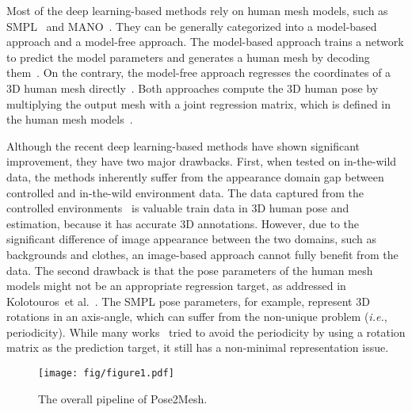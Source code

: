 \documentclass[runningheads]{llncs}
\begin{document}
Most of the deep learning-based methods rely on human mesh models, such as SMPL~\cite{loper2015smpl} and MANO~\cite{romero2017mano}.
They can be generally categorized into a model-based approach and a model-free approach.
The model-based approach trains a network to predict the model parameters and generates a human mesh by decoding them~\cite{bogo2016keep,lassner2017up,pavlakos2018l3d,omran2018neural,kanazawa2018hmr,kolotouros2019spin,panteleris2018using,baek2019pushing,boukhayma20193d}.
On the contrary, the model-free approach regresses the coordinates of a 3D human mesh directly~\cite{kolotouros2019cmr,ge2019handgcn}.
Both approaches compute the 3D human pose by multiplying the output mesh with a joint regression matrix, which is defined in the human mesh models~\cite{loper2015smpl,romero2017mano}.



Although the recent deep learning-based methods have shown significant improvement, they have two major drawbacks.
First, when tested on in-the-wild data, the methods inherently suffer from the appearance domain gap between controlled and in-the-wild environment data.
The data captured from the controlled environments~\cite{ionescu2014human3,Joo2015panoptic} is valuable train data in 3D human pose and estimation, because it has accurate 3D annotations.
However, due to the significant difference of image appearance between the two domains, such as backgrounds and clothes, an image-based approach cannot fully benefit from the data.
The second drawback is that the pose parameters of the human mesh models might not be an appropriate regression target, as addressed in Kolotouros~et al.~\cite{kolotouros2019cmr}.  
The SMPL pose parameters, for example, represent 3D rotations in an axis-angle, which can suffer from the non-unique problem (\textit{i.e.}, periodicity).
While many works~\cite{kanazawa2018hmr,omran2018neural,lassner2017up} tried to avoid the periodicity by using a rotation matrix as the prediction target, it still has a non-minimal representation issue.

\begin{figure}[t]
\setlength\belowcaptionskip{-5ex}
\centerline{
\texttt{[image: fig/figure1.pdf]}}
\caption
{
The overall pipeline of Pose2Mesh.
}
\label{fig:pipeline}
\end{figure}
\end{document}

